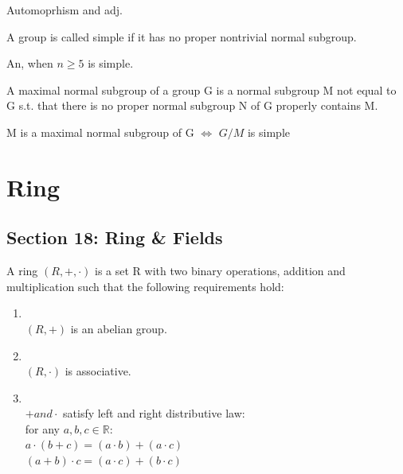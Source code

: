 \documentclass{article}
\newcommand\R{\ensuremath{\mathbb{R}}}
\begin{document}
\begin{Def}
    Automoprhism and adj.
\end{Def}

\begin{Def}
    A group is called simple if it has no proper nontrivial normal subgroup.
\end{Def}
\begin{theorem}
    An, when $n\geq5$ is simple.
\end{theorem}

\begin{Def}
    A maximal normal subgroup of a group G is a normal subgroup M not equal to G s.t. that there is no proper normal subgroup N of G properly contains M.
\end{Def}

\begin{theorem}
    M is a maximal normal subgroup of G $\Leftrightarrow$ $G/M$ is simple
\end{theorem}
\newpage

\section{Ring}


\subsection{Section 18: Ring & Fields}


\begin{Def}
    A ring $(R, +, \cdot)$ is a set R with two binary operations, addition and multiplication such that the following requirements hold:
    \begin{enumerate}
        \item \\ $(R, +)$ is an abelian group.
        \item \\ $(R, \cdot)$ is associative.
        \item \\ $+ and \cdot $ satisfy left and right distributive law:
        \\ for any $a,b, c \in \R$:
        \\ $a\cdot (b+c) = (a \cdot b) + (a \cdot c)$
        \\ $(a+b) \cdot c = (a \cdot c) + (b \cdot c)$
    \end{enumerate}
\end{Def}
\end{document}

